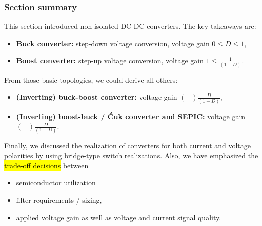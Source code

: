 \begin{frame}
    \frametitle{Section summary}
    This section introduced non-isolated DC-DC converters. The key takeaways are:
    \begin{itemize}
        \item \textbf{Buck converter:} step-down voltage conversion, voltage gain $0\leq D\leq1$,
        \item \textbf{Boost converter:} step-up voltage conversion, voltage gain $1 \leq \frac{1}{(1-D)}$.
    \end{itemize}
    From those basic topologies, we could derive all others:
    \begin{itemize}
        \item \textbf{(Inverting) buck-boost converter:} voltage gain $(-)\frac{D}{(1-D)}$,
        \item \textbf{(Inverting) boost-buck / Ćuk converter and SEPIC:}  voltage gain $(-)\frac{D}{(1-D)}$.
    \end{itemize}
    Finally, we discussed the realization of converters for both current and voltage polarities by using bridge-type switch realizations. Also, we have emphasized the \hl{trade-off decisions} between 
    \begin{itemize}
        \item semiconductor utilization
        \item filter requirements / sizing,
        \item applied voltage gain as well as voltage and current signal quality.
    \end{itemize}
\end{frame}